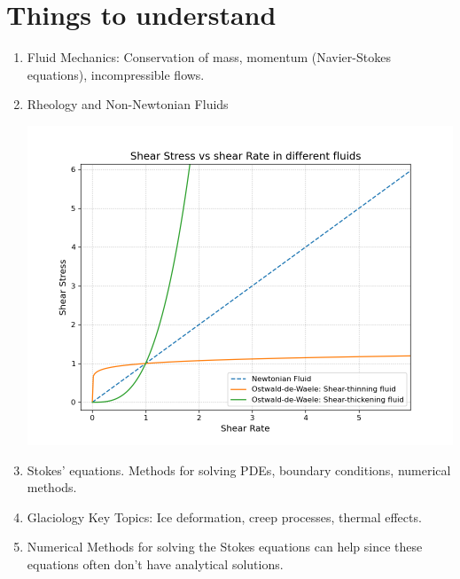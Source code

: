 \chapter{Things to understand}\label{Intro}
\begin{enumerate}
    \item Fluid Mechanics: Conservation of mass, momentum (Navier-Stokes equations), incompressible flows.
    \item Rheology and Non-Newtonian Fluids \begin{Figure}
    \centering
    \includegraphics[width=1\linewidth]{types_of_fluids.png}
    \label{fig:fluids_types}
    \end{Figure}
    \item Stokes' equations. Methods for solving PDEs, boundary conditions, numerical methods.
    \item Glaciology Key Topics: Ice deformation, creep processes, thermal effects.%
    \item Numerical Methods for solving the Stokes equations can help since these equations often don't have analytical solutions.
\end{enumerate}


